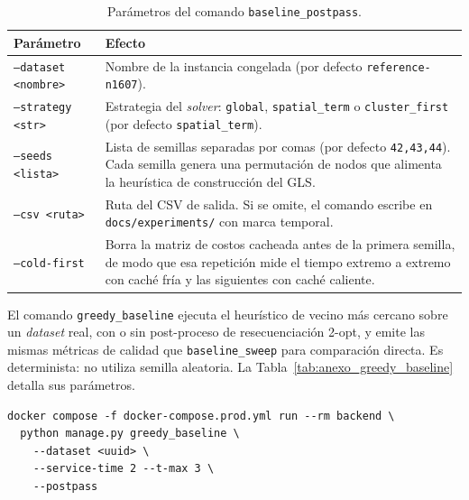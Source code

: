 \begin{table}[H]
  \centering
  \caption{Parámetros del comando \texttt{baseline\_postpass}.}
  \label{tab:anexo_baseline_postpass}
  \small
  \begin{tabularx}{\textwidth}{@{}p{5.5cm} X@{}}
    \toprule
    Parámetro &
      Efecto \\
    \midrule
    \texttt{--dataset <nombre>} &
      Nombre de la instancia congelada (por defecto \texttt{reference-n1607}). \\
    \texttt{--strategy <str>} &
      Estrategia del \textit{solver}: \texttt{global}, \texttt{spatial\_term} o
      \texttt{cluster\_first} (por defecto \texttt{spatial\_term}). \\
    \texttt{--seeds <lista>} &
      Lista de semillas separadas por comas (por defecto \texttt{42,43,44}). Cada semilla
      genera una permutación de nodos que alimenta la heurística de construcción del GLS. \\
    \texttt{--csv <ruta>} &
      Ruta del CSV de salida. Si se omite, el comando escribe en \texttt{docs/experiments/}
      con marca temporal. \\
    \texttt{--cold-first} &
      Borra la matriz de costos cacheada antes de la primera semilla, de modo que esa
      repetición mide el tiempo extremo a extremo con caché fría y las siguientes con caché
      caliente. \\
    \bottomrule
  \end{tabularx}
\end{table}

El comando \texttt{greedy\_baseline} ejecuta el heurístico de vecino más cercano
sobre un \textit{dataset} real, con o sin post-proceso de resecuenciación 2-opt, y
emite las mismas métricas de calidad que \texttt{baseline\_sweep} para comparación
directa. Es determinista: no utiliza semilla aleatoria. La
Tabla~\ref{tab:anexo_greedy_baseline} detalla sus parámetros.

\begin{verbatim}
docker compose -f docker-compose.prod.yml run --rm backend \
  python manage.py greedy_baseline \
    --dataset <uuid> \
    --service-time 2 --t-max 3 \
    --postpass
\end{verbatim}

